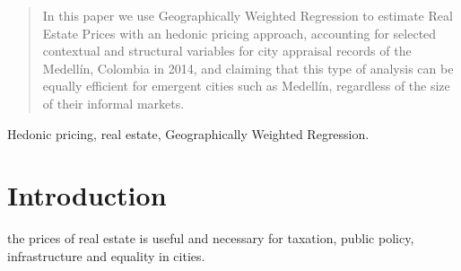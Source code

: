 \documentclass[journal]{IEEEtran}
\begin{document}







\maketitle

\begin{abstract}
In this paper we use Geographically Weighted Regression to estimate Real Estate Prices with an hedonic pricing approach, accounting for selected contextual and structural variables for city appraisal records of the Medellín, Colombia in 2014, and claiming that this type of analysis can be equally efficient for emergent cities such as Medellín, regardless of the size of their informal markets.
\end{abstract}

\begin{IEEEkeywords}
Hedonic pricing, real estate, Geographically Weighted Regression.
\end{IEEEkeywords}






%
\IEEEpeerreviewmaketitle



\section{Introduction}
% 
% 
% 
% 
 the prices of real estate is useful and
necessary for taxation, public policy, infrastructure and equality in cities. 
\end{document}
